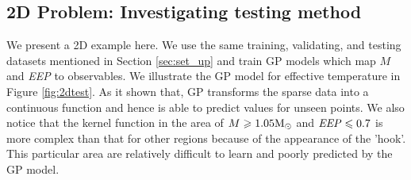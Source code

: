 \subsection{2D Problem: Investigating testing method}

We present a 2D example here.  We use the same training, validating, and testing datasets mentioned in Section \ref{sec:set_up} and train GP models which map $M$ and {\it EEP} to observables. We illustrate the GP model for effective temperature in Figure \ref{fig:2dtest}. As it shown that, GP transforms the sparse data into a continuous function and hence is able to predict values for unseen points.
%
We also notice that the kernel function in the area of $M \geq 1.05 {\rm M_{\odot}}$ and ${\it EEP} \leq 0.7$ is more complex than that for other regions because of the appearance of the 'hook'. This particular area are relatively difficult to learn and poorly predicted by the GP model. 

